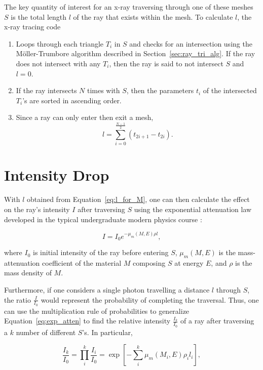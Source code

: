 The key quantity of interest for an x-ray traversing through one of these meshes $S$ is the total length $l$ of the ray that exists within the mesh. To calculate $l$, the x-ray tracing code

\begin{enumerate}
  \item Loops through each triangle $T_i$ in $S$ and checks for an intersection using the Möller-Trumbore algorithm described in Section~\ref{sec:ray_tri_alg}. If the ray does not intersect with any $T_i$, then the ray is said to not intersect $S$ and $l=0$.
  \item If the ray intersects $N$ times with $S$, then the parameters $t_i$ of the intersected $T_i$'s are sorted in ascending order. 
  \item Since a ray can only enter then exit a mesh, 
  \begin{equation}
    l = \sum_{i=0}^{\frac{N-1}{2}} (t_{2i+1} - t_{2i}).
    \label{eq:l_for_M}
  \end{equation}
\end{enumerate}

\section{Intensity Drop}
With $l$ obtained from Equation~\ref{eq:l_for_M}, one can then calculate the effect on the ray's intensity $I$ after traversing $S$ using the exponential attenuation law developed in the typical undergraduate modern physics course \cite{serway}:

\begin{equation}
  I = I_0 e^{-\mu_m(M, E) \rho l},
  \label{eq:exp_atten}
\end{equation}

\noindent where $I_0$ is initial intensity of the ray before entering $S$, $\mu_m(M, E)$ is the mass-attenuation coefficient of the material $M$ composing $S$ at energy $E$, and $\rho$ is the mass density of $M$. 

\par Furthermore, if one considers a single photon travelling a distance $l$ through $S$, the ratio $\frac{I}{I_0}$ would represent the probability of completing the traversal. Thus, one can use the multiplication rule of probabilities to generalize Equation~\ref{eq:exp_atten} to find the relative intensity $\frac{I_k}{I_0}$ of a ray after traversing a $k$ number of different $S$'s. In particular,

\begin{equation}
  \frac{I_k}{I_0} = \prod_i^{k} \frac{I_i}{I_0} =  \exp\left[ -\sum_i^k \mu_m(M_i, E) \rho_i l_i \right],
  \label{eq:exp_atten_k}
\end{equation}

